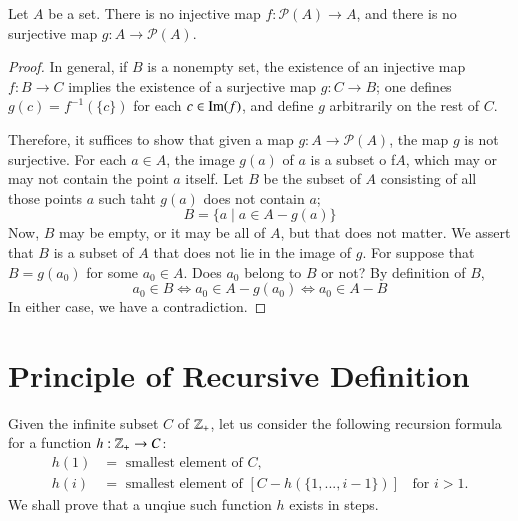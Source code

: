 \documentclass[12pt, a4paper, oneside, openright, titlepage]{book}
\begin{document}
\begin{appendices}
    \begin{thm}
        Let $A$ be a set. There is no injective map $f:\mathscr{P}(A)\rightarrow A$, and there is no surjective map $g:A\rightarrow \mathscr{P}(A)$. 
    \end{thm}
    \begin{proof}
        In general, if $B$ is a nonempty set, the existence of an injective map $f:B\rightarrow C$ implies the existence of a surjective map $g:C\rightarrow B$; one defines $g(c) = f^{-1}(\{c\})$ for each $c \in \operatorname{Im}(f)$, and define $g$ arbitrarily on the rest of $C$.

        Therefore, it suffices to show that given a map $g:A\rightarrow \mathscr{P}(A)$, the map $g$ is not surjective. For each $a \in A$, the image $g(a)$ of $a$ is a subset o f$A$, which may or may not contain the point $a$ itself. Let $B$ be the subset of $A$ consisting of all those points $a$ such taht $g(a)$ does not contain $a$; \begin{equation*}
            B=\{a\;\vert\;a\in A-g(a)\}
        \end{equation*}
        Now, $B$ may be empty, or it may be all of $A$, but that does not matter. We assert that $B$ is a subset of $A$ that does not lie in the image of $g$. For suppose that $B = g(a_0)$ for some $a_0 \in A$. Does $a_0$ belong to $B$ or not? By definition of $B$, \begin{equation*}
            a_0 \in B \iff a_0 \in A-g(a_0) \iff a_0 \in A-B
        \end{equation*}
        In either case, we have a contradiction.
    \end{proof}
    

    \section{Principle of Recursive Definition}

    \begin{rmk}
        Given the infinite subset $C$ of $\mathbb Z_+$, let us consider the following recursion formula for a function $h:\mathbb Z_+\rightarrow C$:\begin{equation*}
            \begin{array}{cl} h(1) &= \text{ smallest element of $C$}, \\
            h(i) &= \text{ smallest element of } [C-h(\{1,...,i-1\})]\;\;\text{ for } i > 1.
            \end{array} \tag{$(\star)$}
        \end{equation*}
        We shall prove that a unqiue such function $h$ exists in steps.
    \end{rmk}


\end{appendices}
\end{document}
